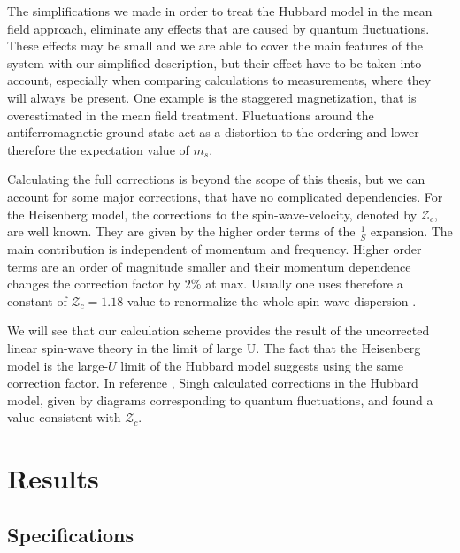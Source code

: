 \documentclass[a4paper,12pt]{report}
\begin{document}
The simplifications we made in order to treat the Hubbard model in the mean field approach,  
eliminate any effects that are caused by quantum fluctuations.
These effects may be small and we are able to cover the main features of the system with our simplified description,
but their effect have to be taken into account, especially when comparing calculations to measurements, where they will always be present.
One example is the staggered magnetization, that is overestimated in the mean field treatment. 
Fluctuations around the antiferromagnetic ground state act as a distortion to the ordering and lower therefore the expectation value of $m_s$.


Calculating the full corrections is beyond the scope of this thesis, but we can account for some major corrections, that have no complicated dependencies.
For the Heisenberg model, the corrections to the spin-wave-velocity, denoted by $\mathcal{Z}_c$, are well known.
They are given by the higher order terms of the $\frac1S$ expansion. 
The main contribution is independent of momentum and frequency. 
Higher order terms are an order of magnitude smaller and their momentum dependence changes the correction factor by $2\%$ at max.
Usually one uses therefore a constant of $\mathcal{Z}_c=1.18$ value to renormalize the whole spin-wave dispersion \cite{PhysRevB.45.10131}.

We will see that our calculation scheme provides the result of the uncorrected linear spin-wave theory in the limit of large U. 
The fact that the Heisenberg model is the large-$U$ limit of the Hubbard model suggests using the same correction factor.
In reference \cite{PhysRevB.43.3617}, Singh calculated corrections in the Hubbard model, 
given by diagrams corresponding to quantum fluctuations,
and found a value consistent with $\mathcal{Z}_c$.







 
 
\chapter{Results}

\section{Specifications} %
\end{document}
